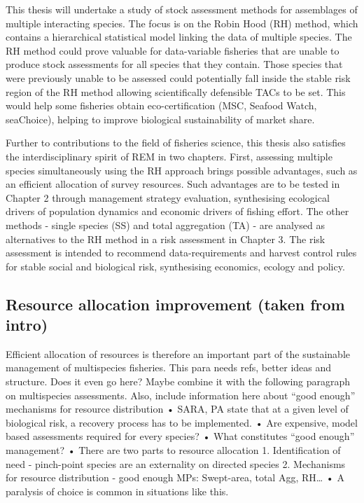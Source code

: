 \documentclass[12pt,]{scrartcl}
\begin{document}
This thesis will undertake a study of stock assessment methods for
assemblages of multiple interacting species. The focus is on the Robin
Hood (RH) method, which contains a hierarchical statistical model
linking the data of multiple species. The RH method could prove valuable
for data-variable fisheries that are unable to produce stock assessments
for all species that they contain. Those species that were previously
unable to be assessed could potentially fall inside the stable risk
region of the RH method allowing scientifically defensible TACs to be
set. This would help some fisheries obtain eco-certification (MSC,
Seafood Watch, seaChoice), helping to improve biological sustainability
of market share.

Further to contributions to the field of fisheries science, this thesis
also satisfies the interdisciplinary spirit of REM in two chapters.
First, assessing multiple species simultaneously using the RH approach
brings possible advantages, such as an efficient allocation of survey
resources. Such advantages are to be tested in Chapter 2 through
management strategy evaluation, synthesising ecological drivers of
population dynamics and economic drivers of fishing effort. The other
methods - single species (SS) and total aggregation (TA) - are analysed
as alternatives to the RH method in a risk assessment in Chapter 3. The
risk assessment is intended to recommend data-requirements and harvest
control rules for stable social and biological risk, synthesising
economics, ecology and policy.

\subsection{Resource allocation improvement (taken from
intro)}\label{resource-allocation-improvement-taken-from-intro}

Efficient allocation of resources is therefore an important part of the
sustainable management of multispecies fisheries. This para needs refs,
better ideas and structure. Does it even go here? Maybe combine it with
the following paragraph on multispecies assessments. Also, include
information here about ``good enough'' mechanisms for resource
distribution • SARA, PA state that at a given level of biological risk,
a recovery process has to be implemented. • Are expensive, model based
assessments required for every species? • What constitutes ``good
enough'' management? • There are two parts to resource allocation 1.
Identification of need - pinch-point species are an externality on
directed species 2. Mechanisms for resource distribution - good enough
MPs: Swept-area, total Agg, RH\ldots{} • A paralysis of choice is common
in situations like this.
\end{document}
